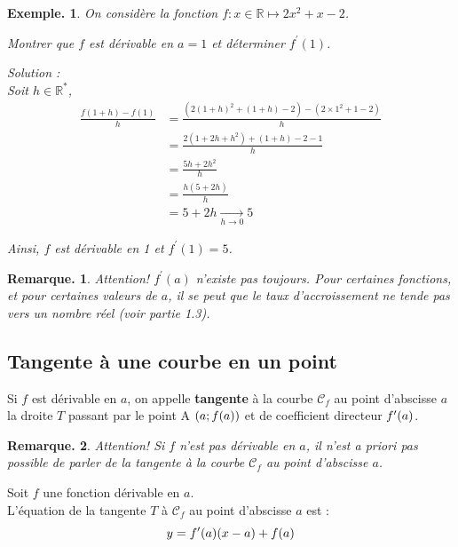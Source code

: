 \documentclass[12pt]{article}
\theoremstyle{break}
\newtheorem*{example}{Exemple.}
\newtheorem*{remark}{Remarque.}
\begin{document}
\begin{example}
On considère la fonction $f: x \in \mathbb{R} \longmapsto 2 x^{2}+x-2$.

Montrer que $f$ est dérivable en $a=1$ et déterminer $f^{\prime}(1)$.

\newpage
Solution :\\
Soit $h \in \mathbb{R}^{*}$,
$$
\begin{aligned}
\frac{f(1+h)-f(1)}{h} & =\frac{\left(2(1+h)^{2}+(1+h)-2\right)-\left(2 \times 1^{2}+1-2\right)}{h} \\
& =\frac{2\left(1+2 h+h^{2}\right)+(1+h)-2-1}{h} \\
& =\frac{5 h+2 h^{2}}{h} \\
& =\frac{h(5+2 h)}{h} \\
& =5+2 h \underset{h \rightarrow 0}{\longrightarrow} 5
\end{aligned}
$$

Ainsi, $f$ est dérivable en 1 et $f^{\prime}(1)=5$.
\end{example}

\begin{remark}
Attention! $f^{\prime}(a)$ n'existe pas toujours. Pour certaines fonctions, et pour certaines valeurs de $a$, il se peut que le taux d'accroissement ne tende pas vers un nombre réel (voir partie 1.3).
\end{remark}

\subsection{Tangente à une courbe en un point}
\begin{definition}{}{}
Si $f$ est dérivable en $a$, on appelle \textbf{tangente} à la courbe $\mathcal{C}_{f}$ au point d'abscisse $a$ la droite $T$ passant par le point A $(a ; f(a))$ et de coefficient directeur $f^{\prime}(a)$.
\end{definition}

\begin{remark}
Attention! Si $f$ n'est pas dérivable en $a$, il n'est \textit{a priori} pas possible de parler de la tangente à la courbe $\mathcal{C}_{f}$ au point d'abscisse $a$.
\end{remark}

\begin{proposition}{}{}
Soit $f$ une fonction dérivable en $a$.\\
L'équation de la tangente $T$ à $\mathcal{C}_{f}$ au point d'abscisse $a$ est :
$$
y=f^{\prime}(a)(x-a)+f(a)
$$
\end{proposition}
\end{document}

